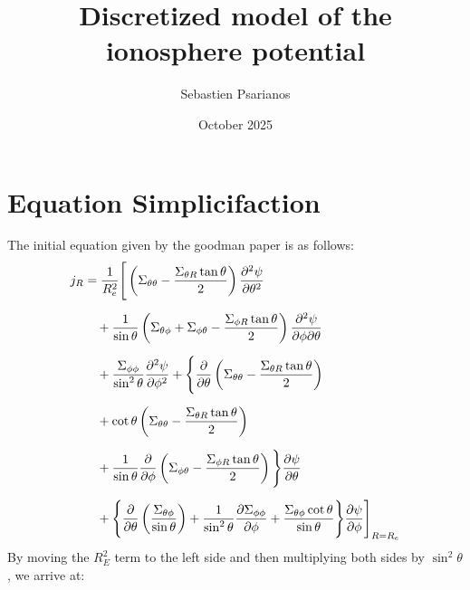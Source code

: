 \documentclass{article}
\title{\vspace{-4cm} Discretized model of the ionosphere potential}
\author{Sebastien Psarianos} \date{October 2025}
\begin{document}
\maketitle
\section{Equation Simplicifaction}

The initial equation given by the goodman paper is as follows:
\begin{equation}
    \label{e:goodman}
	\begin{aligned}
		j_R
		 & = \frac1{R_e^2} \Bigg[
			\left( \Sigma_{\theta\theta} - \frac{\Sigma_{\theta R} \tan\theta}{2} \right)
		\pdv[2]{\psi}{\theta}                                                         \\[6pt]
	 & \quad + \frac1{\sin\theta}
		\left( \Sigma_{\theta\phi} + \Sigma_{\phi\theta} - \frac{\Sigma_{\phi R} \tan\theta}{2} \right)
		\pdv{\psi}{\phi}{\theta}                                                      \\[6pt]
		 & \quad + \frac{\Sigma_{\phi\phi}}{\sin^2\theta}
		\pdv[2]{\psi}{\phi} + \Bigg\{ \pdv{\theta}
		\left( \Sigma_{\theta\theta} - \frac{\Sigma_{\theta R} \tan\theta}{2} \right) \\[6pt]
		 & \quad + \cot\theta
		\left( \Sigma_{\theta\theta} - \frac{\Sigma_{\theta R} \tan\theta}{2} \right) \\[6pt]
		 & \quad + \frac1{\sin\theta} \pdv{\phi}
		\left( \Sigma_{\phi\theta} - \frac{\Sigma_{\phi R} \tan\theta}{2} \right)
		\Bigg\}\pdv{\psi}{\theta}                                                     \\[6pt]
		 & \quad + \Bigg\{\pdv{\theta}
		\left( \frac{\Sigma_{\theta\phi}}{\sin\theta} \right) +
		\frac1{\sin^2\theta}\pdv{\Sigma_{\phi\phi}}{\phi}
		+ \frac{\Sigma_{\theta\phi}\cot\theta}{\sin\theta}
		\Bigg\}\pdv{\psi}{\phi}
		\Bigg]_{R = R_e}
	\end{aligned}
\end{equation}
By moving the $R_E^2$ term to the left side and then multiplying both sides by $\sin^2\theta$, we arrive at:
\end{document}
